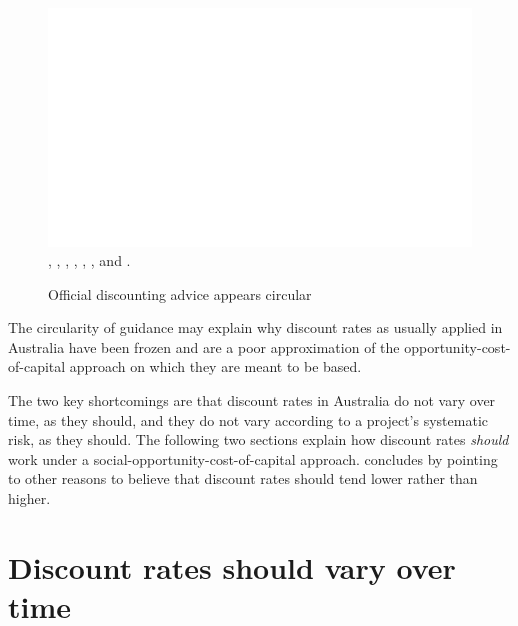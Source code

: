 \documentclass{grattan}
\begin{document}
\begin{figure}
\caption{Official discounting advice appears circular \label{fig:formal-sources-of-discounting-advice}}%
\units{}
\includegraphics[page=20]{Charts/ChartPackDiscountRates.pdf}
%
{\textcite{ATAP-CBA-Guidelines-2016}, \textcite{Victorian-government-2013-economic-evaluation-guidelines}, \textcite{New-South-Wales-Treasury-2017-CBA-Guidelines}, \textcite{Qld-CBA-Guidelines-2016}, \textcite{South-Australia-Treasury-2014-Economic-Evaluation-Guidelines}, \textcite{IA-Assessment-Framework-January-2016}, and \textcite{IA-Assessment-Framework-June-2017}.}
\end{figure}

The circularity of guidance may explain why discount rates as usually applied in Australia have been frozen and are a poor approximation of the opportunity-cost-of-capital approach on which they are meant to be based. 

The two key shortcomings are that discount rates in Australia do not vary over time, as they should, and they do not vary according to a project’s systematic risk, as they should. The following two sections explain how discount rates \textit{should} work under a social-opportunity-cost-of-capital approach.  concludes by pointing to other reasons to believe that discount rates should tend lower rather than higher. 






\section{Discount rates should vary over time}\label{subsec:australian-discount-rates-are-time-invariant}
\end{document}
